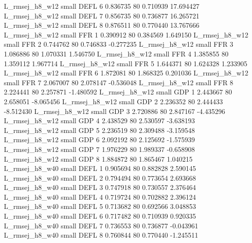 L_rmsej_h8_w12      small     DEFL                 6 0.836735 80       0.710939          17.694427
L_rmsej_h8_w12      small     DEFL                 7 0.856735 80       0.736877          16.265721
L_rmsej_h8_w12      small     DEFL                 8 0.876511 80       0.770440          13.767666
L_rmsej_h8_w12      small      FFR                 1 0.390912 80       0.384569           1.649150
L_rmsej_h8_w12      small      FFR                 2 0.744762 80       0.746833          -0.277235
L_rmsej_h8_w12      small      FFR                 3 1.086886 80       1.070331           1.546750
L_rmsej_h8_w12      small      FFR                 4 1.385855 80       1.359112           1.967714
L_rmsej_h8_w12      small      FFR                 5 1.644371 80       1.624328           1.233905
L_rmsej_h8_w12      small      FFR                 6 1.872081 80       1.868325           0.201036
L_rmsej_h8_w12      small      FFR                 7 2.067007 80       2.078147          -0.536048
L_rmsej_h8_w12      small      FFR                 8 2.224441 80       2.257871          -1.480592
L_rmsej_h8_w12      small      GDP                 1 2.443667 80       2.658051          -8.065456
L_rmsej_h8_w12      small      GDP                 2 2.236352 80       2.444433          -8.512430
L_rmsej_h8_w12      small      GDP                 3 2.720886 80       2.847167          -4.435296
L_rmsej_h8_w12      small      GDP                 4 2.438529 80       2.530597          -3.638193
L_rmsej_h8_w12      small      GDP                 5 2.236519 80       2.309488          -3.159548
L_rmsej_h8_w12      small      GDP                 6 2.092192 80       2.125692          -1.575939
L_rmsej_h8_w12      small      GDP                 7 1.976229 80       1.989337          -0.658908
L_rmsej_h8_w12      small      GDP                 8 1.884872 80       1.865467           1.040215
L_rmsej_h8_w40      small     DEFL                 1 0.905694 80       0.882828           2.590145
L_rmsej_h8_w40      small     DEFL                 2 0.794494 80       0.773654           2.693668
L_rmsej_h8_w40      small     DEFL                 3 0.747918 80       0.730557           2.376464
L_rmsej_h8_w40      small     DEFL                 4 0.719724 80       0.702882           2.396124
L_rmsej_h8_w40      small     DEFL                 5 0.713682 80       0.692566           3.048853
L_rmsej_h8_w40      small     DEFL                 6 0.717482 80       0.710939           0.920335
L_rmsej_h8_w40      small     DEFL                 7 0.736553 80       0.736877          -0.043961
L_rmsej_h8_w40      small     DEFL                 8 0.760844 80       0.770440          -1.245511
